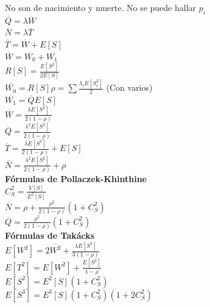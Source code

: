 \begin{minipage}{.22\textwidth}
	No son de nacimiento y muerte.
	No se puede hallar $p_i$ \\
	$\overline{Q}=\lambda{\overline{W}}$ \\
	$\overline{N}=\lambda{\overline{T}}$ \\
	$\overline{T}={\overline{W}}+E[S]$ \\
	$\overline{W}={\overline{W_0}}+{\overline{W_1}}$ \\
	$R[S]=\frac{E[S^2]}{2E[S]}$ \\
	$\overline{W_0}=R[S]\rho=\sum\frac{\lambda_i{E[S_i^2]}}{2}$ (Con varios) \\
	$\overline{W_1}=\overline{Q}E[S]$ \\
	$\overline{W}=\frac{\lambda{E[S^2]}}{2(1-\rho)}$ \\
	$\overline{Q}=\frac{\lambda^2{E[S^2]}}{2(1-\rho)}$ \\
	$\overline{T}=\frac{\lambda{E[S^2]}}{2(1-\rho)}+E[S]$ \\
	$\overline{N}=\frac{\lambda^2{E[S^2]}}{2(1-\rho)}+\rho$ \\
	{\bf Fórmulas de Pollaczek-Khinthine} \\
	$C_S^2=\frac{V[S]}{E^2[S]}$ \\
	$\overline{N}=\rho+\frac{\rho^2}{2(1-\rho)}{(1+C_S^2)}$ \\
	$\overline{Q}=\frac{\rho^2}{2(1-\rho)}{(1+C_S^2)}$ \\
	{\bf Fórmulas de Takácks} \\
	$E[W^2]=2\overline{W^2}+\frac{\lambda{E[S^3]}}{3(1-\rho)}$ \\
	$E[T^2]=E[W^2]+\frac{E[S^2]}{1-\rho}$ \\
	$E[S^2]=E^2[S](1+C_S^2)$ \\
	$E[S^3]=E^3[S](1+C_S^2)(1+2C_S^2)$ \\
\end{minipage}
\vfill\null
\columnbreak
{}
